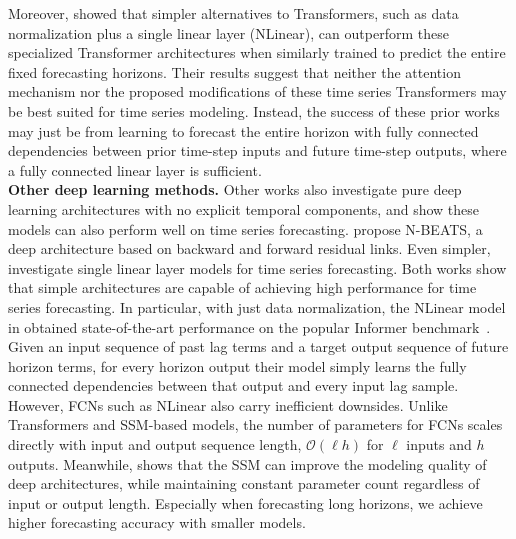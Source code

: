 Moreover, \cite{zeng2022transformers} showed that simpler alternatives to Transformers, such as data normalization plus a single linear layer (NLinear), can outperform these specialized Transformer architectures when similarly trained to predict the entire fixed forecasting horizons. Their results suggest that neither the attention mechanism nor the proposed modifications of these time series Transformers may be best suited for time series modeling. Instead, the success of these prior works  may just be from learning to forecast the entire horizon with fully connected dependencies between prior time-step inputs and future time-step outputs, where a fully connected linear layer is sufficient. \\

\textbf{Other deep learning methods.} Other works also investigate pure deep learning architectures with no explicit temporal components, and show these models can also perform well on time series forecasting. \cite{oreshkin2019n} propose N-BEATS, a deep architecture based on backward and forward residual links. Even simpler, \cite{zeng2022transformers} investigate single linear layer models for time series forecasting. Both works show that simple architectures are capable of achieving high performance for time series forecasting. In particular, with just data normalization, the NLinear model in \cite{zeng2022transformers} obtained state-of-the-art performance on the popular Informer benchmark~\cite{zhou2021informer}. Given an input sequence of past lag terms and a target output sequence of future horizon terms, for every horizon output their model simply learns the fully connected dependencies between that output and every input lag sample. However, FCNs such as NLinear also carry inefficient downsides. Unlike Transformers and SSM-based models, the number of parameters for FCNs scales directly with input and output sequence length, \ie{} $\mathcal{O}(\ell h)$ for $\ell$ inputs and $h$ outputs. Meanwhile, \ourmethod{} shows that the SSM can improve the modeling quality of deep architectures, while maintaining constant parameter count regardless of input or output length. Especially when forecasting long horizons, we achieve higher forecasting accuracy with smaller models.

